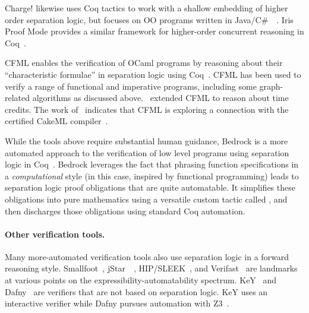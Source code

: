 Charge! likewise uses Coq tactics to work with a shallow embedding of higher 
order separation logic, but focuses on OO programs written in 
Java/C\#~~\cite{bengtson:charge}. Iris Proof Mode provides a similar framework 
for higher-order concurrent reasoning in Coq~\cite{krebbers:iris}.

CFML enables the verification of OCaml programs by reasoning about their
``characteristic formulae'' in separation logic using Coq~\cite{char10, char11}. 
CFML has been used to verify a range of functional and imperative programs,
including some graph-related algorithms as discussed 
above. \citet{charpott15, charpott19}~extended CFML to reason about time 
credits. The work of \citet{gueneau17}~indicates that CFML is exploring a connection 
with the certified CakeML compiler~\cite{cakeml}.

While the tools above require substantial human guidance, 
Bedrock is a more automated approach to the verification of 
low level programs using separation logic in Coq~\cite{chlipala:bedrock}. 
Bedrock leverages the fact that phrasing function 
specifications in a \emph{computational} style 
(in this case, inspired by functional programming) 
leads to separation logic proof obligations that are quite automatable.
It simplifies these obligations into pure mathematics using a 
versatile custom tactic called , and then discharges those 
obligations using standard Coq automation.

\paragraph{Other verification tools.} 

Many more-automated verification tools also use separation logic in a forward
reasoning style. Smallfoot~\cite{berdine:smallfoot}, jStar~~\cite{distefanop08}, 
HIP/SLEEK~\cite{chin:hipsleek}, and Verifast~\cite{jacobs:verifast} are landmarks
at various points on the expressibility-automatability spectrum. 
KeY~\cite{beckert:2007} and Dafny~\cite{leino10} are verifiers that are not 
based on separation logic. KeY uses an interactive verifier while Dafny pursues
 automation with Z3~\cite{moura2008}.

